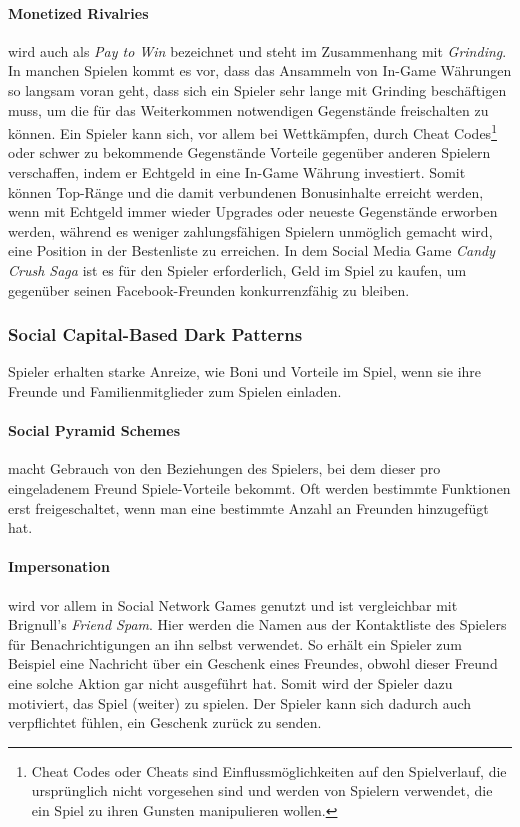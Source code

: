 \documentclass[a4paper]{article}
\begin{document}
\paragraph{Monetized Rivalries} wird auch als \textit{Pay to Win} bezeichnet und steht im Zusammenhang mit \textit{Grinding}. In manchen Spielen kommt es vor, dass das Ansammeln von In-Game Währungen so langsam voran geht, dass sich ein Spieler sehr lange mit Grinding beschäftigen muss, um die für das Weiterkommen notwendigen Gegenstände freischalten zu können.\newline
Ein Spieler kann sich, vor allem bei Wettkämpfen, durch Cheat Codes\footnote{\label{foot:11} Cheat Codes oder Cheats sind Einflussmöglichkeiten auf den Spielverlauf, die ursprünglich nicht vorgesehen sind und werden von Spielern verwendet, die ein Spiel zu ihren Gunsten manipulieren wollen.} oder schwer zu bekommende Gegenstände Vorteile gegenüber anderen Spielern verschaffen, indem er Echtgeld in eine In-Game Währung investiert. Somit können Top-Ränge und die damit verbundenen Bonusinhalte erreicht werden, wenn mit Echtgeld immer wieder Upgrades oder neueste Gegenstände erworben werden, während es weniger zahlungsfähigen Spielern unmöglich gemacht wird, eine Position in der Bestenliste zu erreichen.\newline
In dem Social Media Game \textit{Candy Crush Saga} ist es für den Spieler erforderlich, Geld im Spiel zu kaufen, um gegenüber seinen Facebook-Freunden konkurrenzfähig zu bleiben.  

\subsubsection{Social Capital-Based Dark Patterns}
Spieler erhalten starke Anreize, wie Boni und Vorteile im Spiel, wenn sie ihre Freunde und Familienmitglieder zum Spielen einladen.

\paragraph{Social Pyramid Schemes} macht Gebrauch von den Beziehungen des Spielers, bei dem dieser pro eingeladenem Freund Spiele-Vorteile bekommt. Oft werden bestimmte Funktionen erst freigeschaltet, wenn man eine bestimmte Anzahl an Freunden hinzugefügt hat.

\paragraph{Impersonation} wird vor allem in Social Network Games genutzt und ist vergleichbar mit Brignull's \textit{Friend Spam}. Hier werden die Namen aus der Kontaktliste des Spielers für Benachrichtigungen an ihn selbst verwendet. So erhält ein Spieler zum Beispiel eine Nachricht über ein Geschenk eines Freundes, obwohl dieser Freund eine solche Aktion gar nicht ausgeführt hat. Somit wird der Spieler dazu motiviert, das Spiel (weiter) zu spielen. Der Spieler kann sich dadurch auch verpflichtet fühlen, ein Geschenk zurück zu senden.
\end{document}
